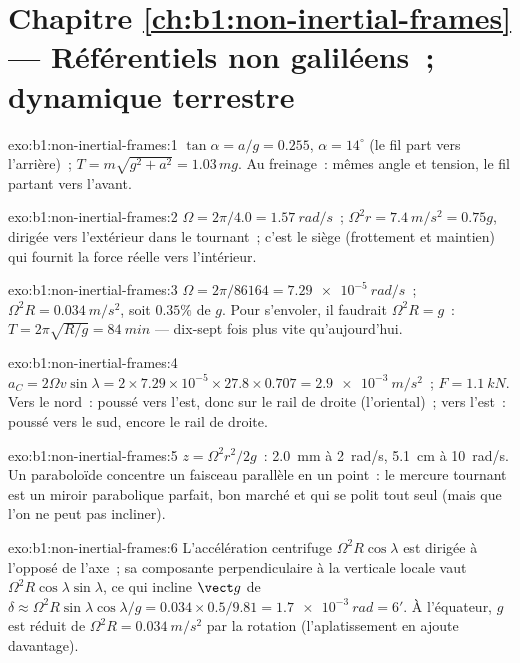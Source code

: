 \section*{Chapitre \ref{ch:b1:non-inertial-frames} --- Référentiels non galiléens~; dynamique terrestre}

\begin{solution}{exo:b1:non-inertial-frames:1}
$\tan\alpha = a/g = 0.255$, $\alpha = 14^\circ$ (le fil part vers
l'arrière)~; $T = m\sqrt{g^2 + a^2} = 1.03\,mg$. Au freinage~: mêmes
angle et tension, le fil partant vers l'avant.
\end{solution}

\begin{solution}{exo:b1:non-inertial-frames:2}
$\Omega = 2\pi/4.0 = \qty{1.57}{rad/s}$~; $\Omega^2r = \qty{7.4}{m/s^2} = 0.75g$,
dirigée vers l'extérieur dans le  tournant~; c'est le siège
(frottement et maintien) qui fournit la force réelle vers l'intérieur.
\end{solution}

\begin{solution}{exo:b1:non-inertial-frames:3}
$\Omega = 2\pi/86164 = \qty{7.29e-5}{rad/s}$~; $\Omega^2R = \qty{0.034}{m/s^2}$,
soit $0.35\%$ de $g$. Pour s'envoler, il faudrait $\Omega^2R = g$~: $T = 2\pi\sqrt{R/g} =
\qty{84}{min}$ --- dix-sept fois plus vite qu'aujourd'hui.
\end{solution}

\begin{solution}{exo:b1:non-inertial-frames:4}
$a_C = 2\Omega v\sin\lambda = 2 \times 7.29\times10^{-5} \times 27.8 \times 0.707
= \qty{2.9e-3}{m/s^2}$~; $F = \qty{1.1}{kN}$. Vers le nord~: poussé vers
l'est, donc sur le rail de droite (l'oriental)~; vers l'est~: poussé vers
le sud, encore le rail de droite.
\end{solution}

\begin{solution}{exo:b1:non-inertial-frames:5}
$z = \Omega^2r^2/2g$~: \qty{2.0}{mm} à \qty{2}{rad/s}, \qty{5.1}{cm} à
\qty{10}{rad/s}. Un paraboloïde concentre un faisceau parallèle en un
point~: le mercure tournant est un miroir parabolique parfait, bon
marché et qui se polit tout seul (mais que l'on ne peut pas incliner).
\end{solution}

\begin{solution}{exo:b1:non-inertial-frames:6}
L'accélération centrifuge $\Omega^2R\cos\lambda$ est dirigée à l'opposé
de l'axe~; sa composante perpendiculaire à la verticale locale vaut $\Omega^2R\cos\lambda
\sin\lambda$, ce qui incline $\vect g$ de $\delta \approx \Omega^2R\sin\lambda\cos\lambda/g
= 0.034 \times 0.5/9.81 = \qty{1.7e-3}{rad} = 6'$. À l'équateur, $g$ est
réduit de $\Omega^2R = \qty{0.034}{m/s^2}$ par la rotation (l'aplatissement
en ajoute davantage).
\end{solution}

